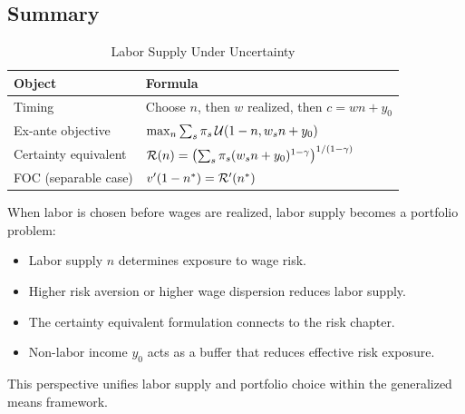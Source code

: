 \subsection{Summary}
\label{subsec:uncertainty-summary}

\begin{table}[H]
\centering
\caption{Labor Supply Under Uncertainty}
\label{tab:uncertainty-summary}
\renewcommand{\arraystretch}{1.6}
\begin{tabular}{@{}ll@{}}
\toprule
\textbf{Object} & \textbf{Formula} \\
\midrule
Timing & Choose $n$, then $w$ realized, then $c = wn + y_0$ \\[6pt]
Ex-ante objective & $\max_n \sum_s \pi_s \, \mathcal{U}(1-n, w_s n + y_0)$ \\[6pt]
Certainty equivalent & $\mathcal{R}(n) = \left( \sum_s \pi_s (w_s n + y_0)^{1-\gamma} \right)^{1/(1-\gamma)}$ \\[6pt]
FOC (separable case) & $v'(1-n^*) = \mathcal{R}'(n^*)$ \\[6pt]
\bottomrule
\end{tabular}
\end{table}

\begin{callouttip}
When labor is chosen before wages are realized, labor supply becomes a portfolio problem:
\begin{itemize}[nosep]
\item Labor supply $n$ determines exposure to wage risk.
\item Higher risk aversion or higher wage dispersion reduces labor supply.
\item The certainty equivalent formulation connects to the risk chapter.
\item Non-labor income $y_0$ acts as a buffer that reduces effective risk exposure.
\end{itemize}
This perspective unifies labor supply and portfolio choice within the generalized means framework.
\end{callouttip}

